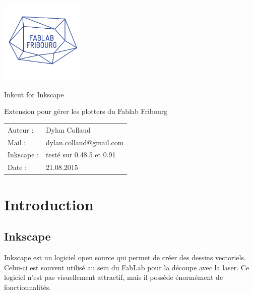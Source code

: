 \documentclass[a4paper,oneside,12pt]{report}
\newcommand{\RapportTitre}{Inkcut for Inkscape}
\newcommand{\RapportLogoFabLab}{\href{http://www.heig-vd.ch/}{\includegraphics[height=4cm]{imgs/fablab_logo_11.png}}}
\begin{document}
\begin{center}
	\RapportLogoFabLab \hfill
\end{center}

\vspace{1cm}
\noindent \hrulefill
\begin{center}
\huge \RapportTitre
\end{center}
\noindent \hrulefill

\begin{center}
\Large Extension pour gérer les plotters du Fablab Fribourg
\end{center}

\vspace{\fill}
\vspace{\fill}

\begin{flushleft}
	\begin{tabular}{l l}
		Auteur : &Dylan Collaud\\
		Mail : &dylan.collaud@gmail.com\\
		Inkscape : &testé sur 0.48.5 et 0.91\\
		Date : &21.08.2015\\
	\end{tabular}

\end{flushleft}

\vspace{\fill}

\pagestyle{empty} %

\tableofcontents %
\cleardoublepage %

\pagestyle{plain} %





\chapter{Introduction}\label{Intro}

\section{Inkscape}\label{Inkscape}
Inkscape est un logiciel open source qui permet de créer des dessins vectoriels. Celui-ci est souvent utilisé au sein du FabLab
pour la découpe avec la laser. Ce logiciel n'est pas visuellement attractif, mais il possède énormément de fonctionnalités.
\end{document}
